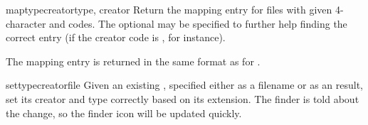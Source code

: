 \begin{methoddesc}[IC]{maptypecreator}{type, creator}
Return the mapping entry for files with given 4-character  and
 codes. The optional  may be specified to
further help finding the correct entry (if the creator code is
, for instance).

The mapping entry is returned in the same format as for .
\end{methoddesc}

\begin{methoddesc}[IC]{settypecreator}{file}
Given an existing , specified either as a filename or as an
 result, set its creator and type correctly based
on its extension.  The finder is told about the change, so the finder
icon will be updated quickly.
\end{methoddesc}
